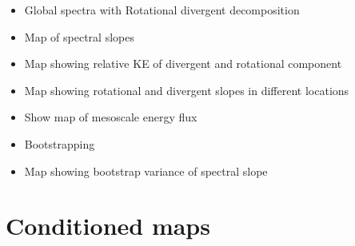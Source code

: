 \begin{itemize}
\item{Global spectra with Rotational divergent decomposition}

\item{Map of spectral slopes}

\item{Map showing relative KE of divergent and rotational component}

\item{Map showing rotational and divergent slopes in different locations}

\item{Show map of mesoscale energy flux}

\item{Bootstrapping}

\item{Map showing bootstrap variance of spectral slope}
		
\end{itemize}

\section{Conditioned maps}

